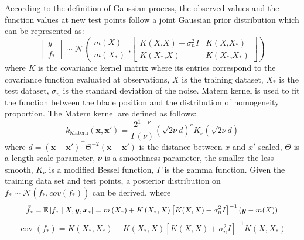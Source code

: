 \documentclass[pdflatex,sn-mathphys]{sn-jnl}%
\theoremstyle{thmstyleone}%
\theoremstyle{thmstyletwo}%
\theoremstyle{thmstylethree}%
\begin{document}
According to the definition of Gaussian process, the observed values and the function values at new test points follow a joint Gaussian prior distribution which can be represented as:
\begin{equation}
    \begin{bmatrix}y\\f_\ast\end{bmatrix}\sim\mathcal N\left(\begin{array}{c}m(X)\\m(X_\ast)\end{array}\text{,}\begin{bmatrix}K(X\text{,}X)+\sigma_n^2I&K(X\text{,}X_\ast)\\K(X_\ast\text{,}X)&K(X_\ast\text{,}X_\ast)\end{bmatrix}\right)
\end{equation}
where $K$ is the covariance kernel matrix where its entries correspond to the covariance function evaluated at observations, $X$ is the training dataset,  $X_*$ is the test dataset, $\sigma_n$ is the standard deviation of the noise. Matern kernel is used to fit the function between the blade position and the distribution of homogeneity proportion. The Matern kernel are defined as follows:
\begin{equation}
   k_{\text{Matern}}(\mathbf{x}, \mathbf{x'}) = \frac{2^{1 - \nu}}{\Gamma(\nu)}
   \left( \sqrt{2 \nu} d \right)^{\nu} K_\nu \left( \sqrt{2 \nu} d \right)
\end{equation}
where $d = (\mathbf{x} - \mathbf{x'})^\top \Theta^{-2} (\mathbf{x} - \mathbf{x'})$ is the distance between $x$ and $x'$ scaled, $\Theta$ is a length scale parameter, $\nu$ is a smoothness parameter, the smaller the less smooth, $K_\nu$ is a modified Bessel function, $\Gamma$ is the gamma function. 
Given the training data set and test points, a posterior distribution on $f_*\sim\mathcal N(\bar{f}_{*},cov(f_{*}))$ can be derived, where
\begin{equation}
\small
\bar{f}_{*}=\mathbb{E}\left[f_{*} \mid X, \boldsymbol{y}, \boldsymbol{x}_{*}\right]=m\left(X_{*}\right)+K\left(X_{*}, X\right)\left[K(X, X)+\sigma_{n}^{2} I\right]^{-1}(\boldsymbol{y}-m(X))
\end{equation}
\begin{equation}
\operatorname{cov}\left(f_{*}\right)=K\left(X_{*}, X_{*}\right)-K\left(X_{*}, X\right)\left[K(X, X)+\sigma_{n}^{2} I\right]^{-1} K\left(X, X_{*}\right)
\end{equation}
\end{document}
